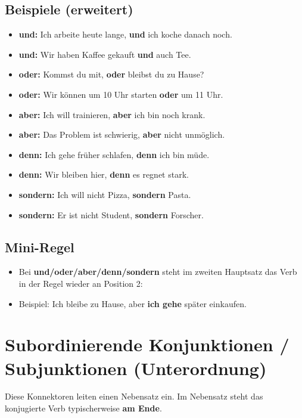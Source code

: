 \documentclass[a4paper,12pt]{article}
\begin{document}
        \subsection{Beispiele (erweitert)}
            \begin{itemize}[leftmargin=2em]
				\item \textbf{und:} Ich arbeite heute lange, \textbf{und} ich koche danach noch.
                \item \textbf{und:} Wir haben Kaffee gekauft \textbf{und} auch Tee.
                \item \textbf{oder:} Kommst du mit, \textbf{oder} bleibst du zu Hause?
                \item \textbf{oder:} Wir können um 10 Uhr starten \textbf{oder} um 11 Uhr.
                \item \textbf{aber:} Ich will trainieren, \textbf{aber} ich bin noch krank.
                \item \textbf{aber:} Das Problem ist schwierig, \textbf{aber} nicht unmöglich.
                \item \textbf{denn:} Ich gehe fr\"uher schlafen, \textbf{denn} ich bin m\"ude.
                \item \textbf{denn:} Wir bleiben hier, \textbf{denn} es regnet stark.
                \item \textbf{sondern:} Ich will nicht Pizza, \textbf{sondern} Pasta.
                \item \textbf{sondern:} Er ist nicht Student, \textbf{sondern} Forscher.
            \end{itemize}
        
        \subsection{Mini-Regel}
            \begin{itemize}[leftmargin=2em]
				\item Bei \textbf{und/oder/aber/denn/sondern} steht im zweiten Hauptsatz das Verb in der Regel wieder an Position 2:
                \item Beispiel: Ich bleibe zu Hause, aber \textbf{ich gehe} sp\"ater einkaufen.
            \end{itemize}
    
    
    \section{Subordinierende Konjunktionen / Subjunktionen (Unterordnung)}
        Diese Konnektoren leiten einen Nebensatz ein.
        Im Nebensatz steht das konjugierte Verb typischerweise \textbf{am Ende}.
        
\end{document}
